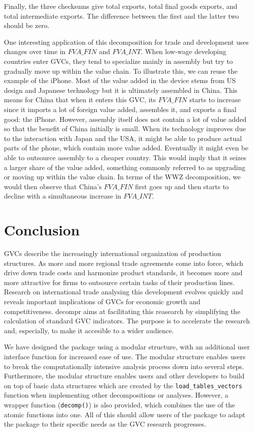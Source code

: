 \documentclass[a4paper]{article}\usepackage[]{graphicx}\usepackage[]{color}
\newcommand{\code}[1]{\texttt{#1}}
\begin{document}
Finally, the three checksums give total exports, total final goods
exports, and total intermediate exports. The difference between the
first and the latter two should be zero.

One interesting application of this decomposition for trade and development
uses changes over time in $FVA\_FIN$ and $FVA\_INT$. When low-wage
developing countries enter GVCs, they tend to specialize mainly in
assembly but try to gradually move up within the value chain. To illustrate
this, we can reuse the example of the iPhone. Most of the value added
in the device stems from US design and Japanese technology but it
is ultimately assembled in China. This means for China that when it
enters this GVC, its $FVA\_FIN$ starts to increase since it imports
a lot of foreign value added, assembles it, and exports a final good:
the iPhone. However, assembly itself does not contain a lot of value
added so that the benefit of China initially is small. When its technology
improves due to the interaction with Japan and the USA, it might be
able to produce actual parts of the phone, which contain more value
added. Eventually it might even be able to outsource assembly to a
cheaper country. This would imply that it seizes a larger share of
the value added, something commonly referred to as upgrading or moving
up within the value chain. In terms of the WWZ decomposition, we would
then observe that China's $FVA\_FIN$ first goes up and then starts
to decline with a simultaneous increase in $FVA\_INT$.

\section{Conclusion}

\label{sec:conclusion}GVCs describe the increasingly international
organization of production structures. As more and more regional trade
agreements come into force, which drive down trade costs and harmonize
product standards, it becomes more and more attractive for firms to
outsource certain tasks of their production lines. Research on international
trade analysing this development evolves quickly and reveals important
implications of GVCs for economic growth and competitiveness. decompr
aims at facilitating this reasearch by simplifying the calculation
of standard GVC indicators. The purpose is to accelerate the research
and, especially, to make it accesible to a wider audience.

We have designed the package using a modular structure, with an additional
user interface function for increased ease of use. The modular structure
enables users to break the computationally intensive analysis process
down into several steps. Furthermore, the modular structure enables
users and other developers to build on top of basic data structures
which are created by the \code{load\_tables\_vectors} function when
implementing other decompositions or analyses. However, a wrapper
function (\code{decomp()}) is also provided, which combines the use
of the atomic functions into one. All of this should allow users of
the package to adapt the package to their specific needs as the GVC
research progresses.
\end{document}
